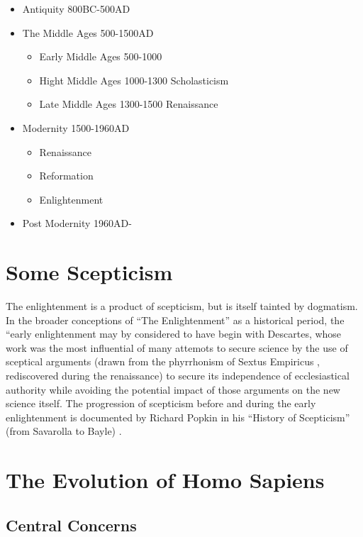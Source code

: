 \documentclass[10pt,titlepage]{book}
\begin{document}
\begin{itemize}
\item Antiquity 800BC-500AD
\item The Middle Ages 500-1500AD
    \begin{itemize}
  \item Early Middle Ages 500-1000
  \item Hight Middle Ages 1000-1300 Scholasticism
  \item Late Middle Ages 1300-1500 Renaissance    
    \end{itemize}
\item Modernity 1500-1960AD
  \begin{itemize}
  \item Renaissance
  \item Reformation
  \item Enlightenment    
    \end{itemize}
\item Post Modernity 1960AD- 
\end{itemize}


\section{Some Scepticism}

The enlightenment is a product of scepticism, but is itself tainted by dogmatism.
In the broader conceptions of ``The Enlightenment'' as a historical period, the ``early enlightenment may by considered to have begin with Descartes, whose work was the most influential of many attemots to secure science by the use of sceptical arguments (drawn from the phyrrhonism of Sextus Empiricus \cite{sextusempiricusOOP}, rediscovered during the renaissance) to secure its independence of ecclesiastical authority while avoiding the potential impact of those arguments on the new science itself.
The progression of scepticism before and during the early enlightenment is documented by Richard Popkin in his ``History of Scepticism'' (from Savarolla to Bayle) \cite{popkin03}.


\section{The Evolution of Homo Sapiens}



\subsection{Central Concerns}
\end{document}
